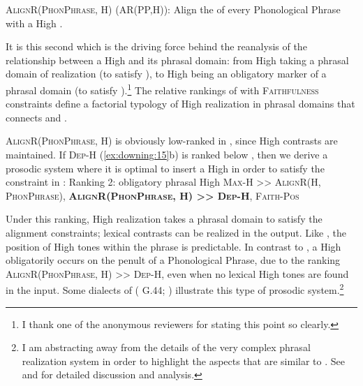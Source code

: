 \documentclass[output=paper,newtxmath,modfonts,nonflat,hidelinks]{langsci/langscibook}
\begin{document}
\ea\label{ex:downing:20}\textsc{AlignR(PhonPhrase, H}) (AR(PP,H)):
Align the  of every Phonological Phrase with a High .
\z

It is this second  which is the driving force behind the reanalysis of the relationship between a High  and its phrasal domain: from High  taking a phrasal domain of realization (to satisfy ), to High  being an obligatory marker of a phrasal domain (to satisfy ).\footnote{I thank one of the anonymous reviewers for stating this point so clearly.} The relative rankings of  with \textsc{Faithfulness} constraints define a factorial typology of High  realization in phrasal domains that connects  and .

\textsc{AlignR(PhonPhrase, H}) is obviously low-ranked in , since High  contrasts are maintained. If \textsc{Dep-H} (\ref{ex:downing:15}b) is ranked below , then we derive a prosodic system where it is optimal to insert a High  in order to satisfy the constraint in :
\ea\label{ex:downing:21} Ranking 2: obligatory phrasal High 
\sn
\textsc{Max-H >> AlignR(H, PhonPhrase}), \textbf{\textsc{AlignR(PhonPhrase, H}}\textbf{) \textsc{>> Dep-H}}\textsc{, Faith-Pos}
\z

Under this ranking, High  realization takes a phrasal domain to satisfy the alignment constraints; lexical  contrasts can be realized in the output. Like , the position of High tones within the phrase is predictable. In contrast to , a High  obligatorily occurs on the penult of a Phonological Phrase, due to the ranking \textsc{AlignR(PhonPhrase, H}) >> \textsc{Dep-H}, even when no lexical High tones are found in the input. Some dialects of  ( G.44; \citealt{Cassimjee&Kisseberth1998,Patin2017}) illustrate this type of prosodic system.\footnote{I am abstracting away from the details of the very complex  phrasal  realization system in order to highlight the aspects that are similar to . See \citet{Cassimjee&Kisseberth1998,Patin2007,Patin2017} and \citet{Philipson2005} for detailed discussion and analysis.}
\end{document}
